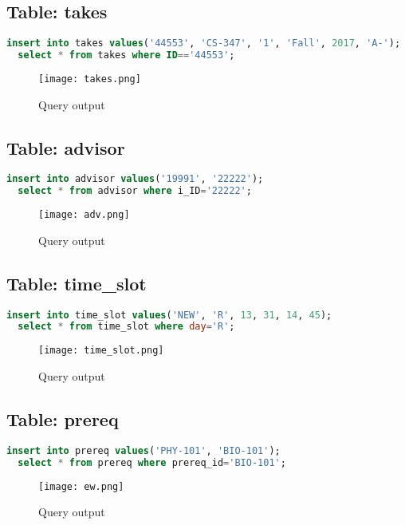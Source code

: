 \documentclass{article}
\begin{document}
\subsection{Table: takes}
\begin{lstlisting}[language=sql]
  insert into takes values('44553', 'CS-347', '1', 'Fall', 2017, 'A-');
  select * from takes where ID=='44553';
\end{lstlisting}
\begin{figure}[!ht]
  \begin{center}
  \texttt{[image: takes.png]}
  \caption{Query output}
  \end{center}
\end{figure}

\newpage
\subsection{Table: advisor}
\begin{lstlisting}[language=sql]
  insert into advisor values('19991', '22222');
  select * from advisor where i_ID='22222';
\end{lstlisting}
\begin{figure}[!ht]
  \begin{center}
  \texttt{[image: adv.png]}
  \caption{Query output}
  \end{center}
\end{figure}

\subsection{Table: time\_slot}
\begin{lstlisting}[language=sql]
  insert into time_slot values('NEW', 'R', 13, 31, 14, 45);
  select * from time_slot where day='R';
\end{lstlisting}
\begin{figure}[!ht]
  \begin{center}
  \texttt{[image: time\_slot.png]}
  \caption{Query output}
  \end{center}
\end{figure}

\subsection{Table: prereq}
\begin{lstlisting}[language=sql]
  insert into prereq values('PHY-101', 'BIO-101');
  select * from prereq where prereq_id='BIO-101';
\end{lstlisting}
\begin{figure}[!ht]
  \begin{center}
  \texttt{[image: ew.png]}
  \caption{Query output}
  \end{center}
\end{figure}
\end{document}
